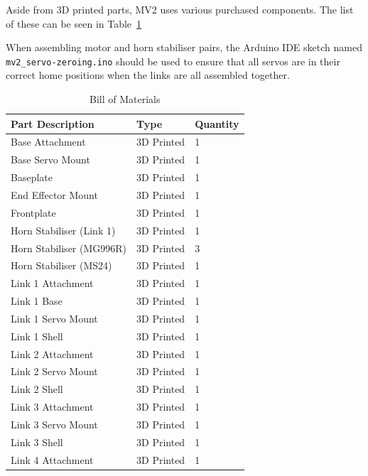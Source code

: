 \documentclass[a4paper,11pt]{article}
\begin{document}
Aside from 3D printed parts, MV2 uses various purchased components. The list of these can be seen in Table~\ref{tab:bom}

When assembling motor and horn stabiliser pairs, the Arduino IDE sketch named \texttt{mv2\_servo-zeroing.ino} should be used to ensure that all servos are in their correct home positions when the links are all assembled together.

\begin{table}[htbp]
    \centering
    \caption{Bill of Materials}
    \label{tab:bom}
    \begin{tabular}{|l|l|l|}
        \hline
        \textbf{Part Description} & \textbf{Type} & \textbf{Quantity} \\
        \hline
        Base Attachment & 3D Printed & 1 \\
        \hline
        Base Servo Mount & 3D Printed & 1 \\
        \hline
        Baseplate & 3D Printed & 1 \\
        \hline
        End Effector Mount & 3D Printed & 1 \\
        \hline
        Frontplate & 3D Printed & 1 \\
        \hline
        Horn Stabiliser (Link 1) & 3D Printed & 1 \\
        \hline
        Horn Stabiliser (MG996R) & 3D Printed & 3 \\
        \hline
        Horn Stabiliser (MS24) & 3D Printed & 1 \\
        \hline
        Link 1 Attachment & 3D Printed & 1 \\
        \hline
        Link 1 Base & 3D Printed & 1 \\
        \hline
        Link 1 Servo Mount & 3D Printed & 1 \\
        \hline
        Link 1 Shell & 3D Printed & 1 \\
        \hline
        Link 2 Attachment & 3D Printed & 1 \\
        \hline
        Link 2 Servo Mount & 3D Printed & 1 \\
        \hline
        Link 2 Shell & 3D Printed & 1 \\
        \hline
        Link 3 Attachment & 3D Printed & 1 \\
        \hline
        Link 3 Servo Mount & 3D Printed & 1 \\
        \hline
        Link 3 Shell & 3D Printed & 1 \\
        \hline
        Link 4 Attachment & 3D Printed & 1 \\

\end{tabular}
\end{table}
\end{document}
